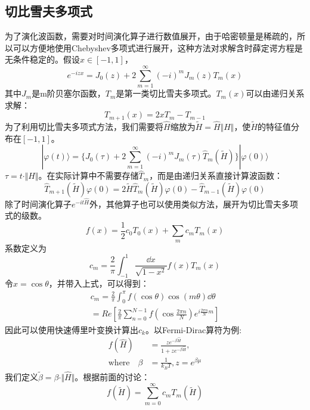 \begin{multicols}{2}
\subsection{切比雪夫多项式}
为了演化波函数，需要对时间演化算子进行数值展开，由于哈密顿量是稀疏的，所以可以方便地使用Chebyshev多项式进行展开，这种方法对求解含时薛定谔方程是无条件稳定的。假设$x\in[-1,1]$，
\begin{equation}
    e^{-izx}=J_0(z)+2\sum_{m=1}^{\infty}(-i)^mJ_m(z)T_m(x)
\end{equation}
其中$J_m$是m阶贝塞尔函数，$T_m$是第一类切比雪夫多项式。$T_m(x)$可以由递归关系求解：
\begin{equation}
    T_{m+1}(x)=2xT_{m}-T_{m-1}
\end{equation}
为了利用切比雪夫多项式方法，我们需要将$\hat{H}$缩放为$\tilde{H}=\hat{H}\Vert H\Vert$，使$\tilde{H}$的特征值分布在$[-1,1]$。
\begin{equation}
    |\varphi(t)\rangle=\{J_0(\tau)+2\sum_{m=1}^{\infty}(-i)^mJ_m(\tau)\hat{T}_m(\tilde{H})\}|\varphi(0)\rangle
\end{equation}
$\tau=t\cdot\Vert H\Vert$。在实际计算中不需要存储$\hat{T}_m$，而是由递归关系直接计算波函数：
\begin{equation}
    \hat{T}_{m+1}(\tilde{H})\varphi(0)=2\tilde{H}\hat{T}_{m}(\tilde{H})\varphi(0)-\hat{T}_{m-1}(\tilde{H})\varphi(0)
\end{equation}
除了时间演化算子$e^{-it\hat{H}}$外，其他算子也可以使用类似方法，展开为切比雪夫多项式的级数。
\begin{equation}
    f(x)=\frac{1}{2}c_0T_0(x)+\sum_{m}c_mT_m(x)
\end{equation}
系数定义为
\begin{equation}
    c_m=\frac{2}{\pi}\int_{-1}^{1}\frac{\dd{x}}{\sqrt{1-x^2}}f(x)T_m(x)
\end{equation}
令$x=\cos{\theta}$，并带入上式，可以得到：
\begin{equation}
    \begin{aligned}
        c_m=\frac{2}{\pi}\int_{0}^{\pi}f(\cos{\theta})\cos(m\theta)\dd{\theta}\\
        =Re[\frac{2}{\pi}\sum_{n=0}^{N-1}f(\cos\frac{2\pi n}{N})e^{i\frac{2\pi n}{N}m}]
    \end{aligned}
\end{equation}
因此可以使用快速傅里叶变换计算出$c_k$。以Fermi-Dirac算符为例:
\begin{equation}
    \begin{aligned}
        f(\hat{H})&=\frac{ze^{-\beta\hat{H}}}{1+ze^{-\beta\hat{H}}},\\
        \text{where}\quad\beta&=\frac{1}{k_BT},z=e^{\beta\mu}
    \end{aligned}
\end{equation}
我们定义$\tilde{\beta}=\beta\cdot\Vert\hat{H}\Vert$。根据前面的讨论：
\begin{equation}
    f(\tilde{H})=\sum_{m=0}^{\infty}c_mT_m(\tilde{H})
\end{equation}

\end{multicols}
